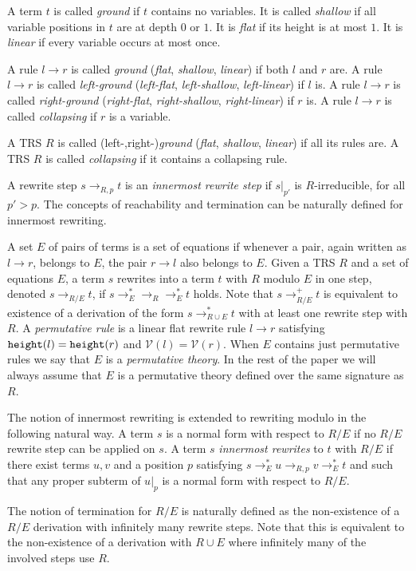\documentclass{LMCS}
\theoremstyle{plain}
\def\Vars{{\mathcal V}}
\begin{document}
A term $t$ is called {\em ground} if $t$ contains no variables.
It is called {\em shallow} if all variable positions in $t$ are
at depth $0$ or $1$.
It is {\em flat} if its height is at most $1$.
It is {\em linear} if every variable occurs at most once.



A rule $l\to r$ is called {\em ground} ({\em flat}, {\em shallow},
{\em linear})
if both $l$ and $r$ are. A rule $l\to r$ is called
{\em left-ground} ({\em left-flat}, {\em left-shallow}, {\em
left-linear}) if $l$ is.
A rule $l\to r$ is called
{\em right-ground} ({\em right-flat}, {\em right-shallow},
{\em right-linear}) if $r$ is.
A rule $l\to r$ is called {\em collapsing} if $r$ is a variable.

A TRS $R$ is called (left-,right-){\em ground} ({\em flat}, {\em shallow},
{\em linear}) if all its rules are. A TRS $R$ is called {\em collapsing}
if it contains a collapsing rule.

A rewrite step
$s \rightarrow_{R, p} t$
is an {\em innermost rewrite step} if
$s|_{p'}$ is $R$-irreducible, for all $p'>p$.
The concepts of reachability and termination
can be naturally defined for innermost
rewriting.

A set $E$ of pairs of terms is a set of equations if
whenever a pair, again written as $l\to r$, belongs to $E$, 
the pair $r\to l$ also belongs to $E$.
Given a TRS $R$ and a set of equations $E$,
a term $s$ rewrites into a term $t$ with $R$ modulo $E$ in one step,
denoted $s\to_{R/E}t$, if $s\to_E^*\to_R\to_E^*t$ holds.
Note that $s\to_{R/E}^+t$ is equivalent to existence
of a derivation of the form $s\to_{R\cup E}^*t$ with
at least one rewrite step with $R$.
A {\em permutative rule} is a linear flat rewrite rule $l\to r$
satisfying ${\tt height}(l)={\tt height}(r)$ and $\Vars(l)=\Vars(r)$.
When $E$ contains just permutative rules we say that $E$
is a {\em permutative theory}.
In the rest of the paper
we will always assume that $E$ is a permutative theory
defined over the same signature as $R$.

The notion of innermost rewriting is extended to rewriting
modulo in the following natural way. A term $s$ is a normal
form with respect to $R/E$ if no $R/E$ rewrite step can
be applied on $s$. A term $s$ {\em{innermost rewrites}} to $t$
with $R/E$ if there exist terms $u,v$ and a position $p$ satisfying
$s\to_E^*u\to_{R,p}v\to_E^*t$ and such that any proper subterm
of $u|_p$ is a normal form with respect to $R/E$.

The notion of termination for $R/E$ is naturally defined
as the non-existence of a $R/E$ derivation with infinitely
many rewrite steps.
Note that this is equivalent to the non-existence of
a derivation with $R\cup E$ where infinitely many
of the involved steps use $R$.
\end{document}
